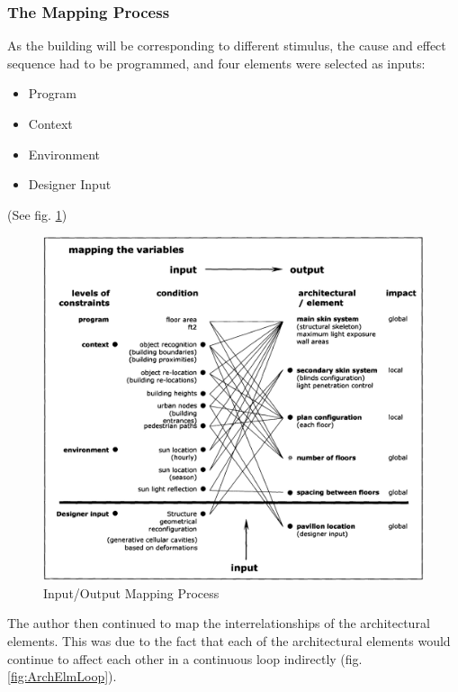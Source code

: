 \subsubsection{The Mapping Process}

As the building will be corresponding to different stimulus, the cause and effect sequence had to be programmed, and four elements were selected as inputs:
\vspace{-0.3cm}
\begin{itemize}[nolistsep]
\item Program
\item Context
\item Environment
\item Designer Input
\end{itemize}
\vspace{-0.4cm}
(See fig. \ref{fig:MapProcs})

\begin{figure}[htbp]
\centering
\includegraphics[width=\textwidth]{./Images/10-MapProcs}
\caption[Input/Output Mapping Process]{Input/Output Mapping Process \cite{zulas04}}
\label{fig:MapProcs}
\end{figure}

The author then continued to map the interrelationships of the architectural elements. This was due to the fact that each of the architectural elements would continue to affect each other in a continuous loop indirectly (fig. \ref{fig:ArchElmLoop}).

